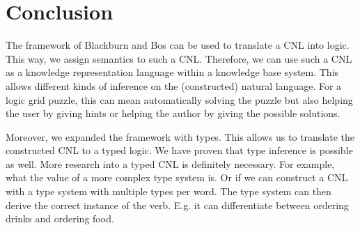 \section{Conclusion}
The framework of Blackburn and Bos can be used to translate a CNL into logic. This way, we assign semantics to such a CNL. Therefore, we can use such a CNL as a knowledge representation language within a knowledge base system. This allows different kinds of inference on the (constructed) natural language. For a logic grid puzzle, this can mean automatically solving the puzzle but also helping the user by giving hints or helping the author by giving the possible solutions.

Moreover, we expanded the framework with types. This allows us to translate the constructed CNL to a typed logic. We have proven that type inference is possible as well. More research into a typed CNL is definitely necessary. For example, what the value of a more complex type system is. Or if we can construct a CNL with a type system with multiple types per word. The type system can then derive the correct instance of the verb. E.g. it can differentiate between ordering drinks and ordering food.
